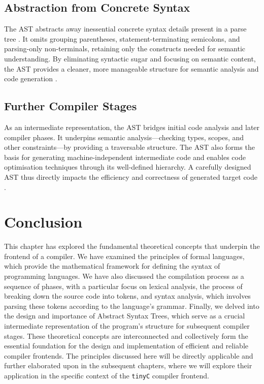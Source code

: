 \subsection{Abstraction from Concrete Syntax}

The AST abstracts away inessential concrete syntax details present in a parse tree \cite{aho2007compilers}. It omits grouping parentheses, statement-terminating semicolons, and parsing-only non-terminals, retaining only the constructs needed for semantic understanding. By eliminating syntactic sugar and focusing on semantic content, the AST provides a cleaner, more manageable structure for semantic analysis and code generation \cite{aho2007compilers}.

\subsection{Further Compiler Stages}

As an intermediate representation, the AST bridges initial code analysis and later compiler phases. It underpins semantic analysis—checking types, scopes, and other constraints—by providing a traversable structure. The AST also forms the basis for generating machine-independent intermediate code and enables code optimisation techniques through its well-defined hierarchy. A carefully designed AST thus directly impacts the efficiency and correctness of generated target code \cite{aho2007compilers}.

\section{Conclusion}

This chapter has explored the fundamental theoretical concepts that underpin the frontend of a compiler. We have examined the principles of formal languages, which provide the mathematical framework for defining the syntax of programming languages. We have also discussed the compilation process as a sequence of phases, with a particular focus on lexical analysis, the process of breaking down the source code into tokens, and syntax analysis, which involves parsing these tokens according to the language's grammar. Finally, we delved into the design and importance of Abstract Syntax Trees, which serve as a crucial intermediate representation of the program's structure for subsequent compiler stages. These theoretical concepts are interconnected and collectively form the essential foundation for the design and implementation of efficient and reliable compiler frontends. The principles discussed here will be directly applicable and further elaborated upon in the subsequent chapters, where we will explore their application in the specific context of the \texttt{tinyC} compiler frontend.